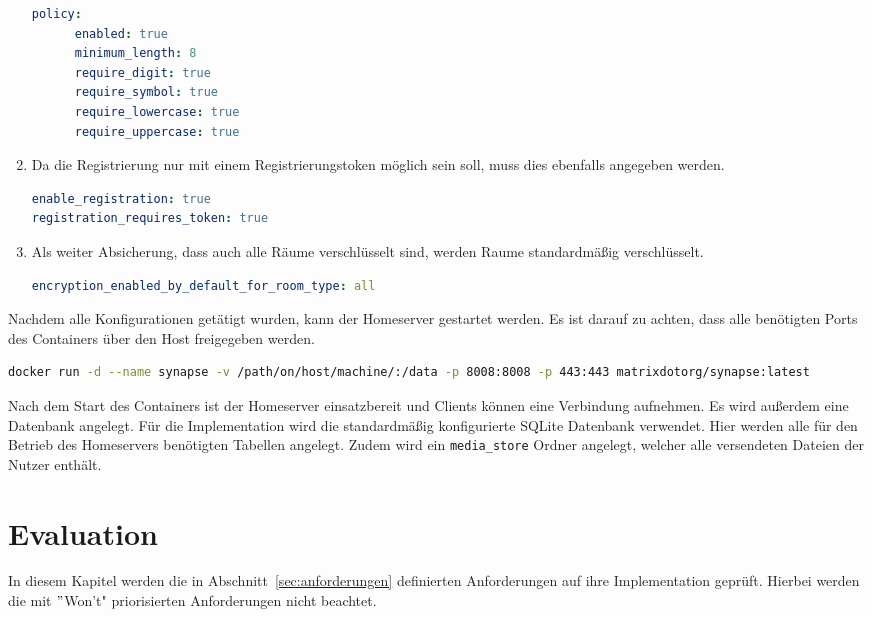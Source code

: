 \begin{enumerate}[label={(\arabic*)}]
\begin{lstlisting}[language=yaml,label={lst:password-policy}]
   policy:
      enabled: true
      minimum_length: 8
      require_digit: true
      require_symbol: true
      require_lowercase: true
      require_uppercase: true
            \end{lstlisting}
        \item Da die Registrierung nur mit einem Registrierungstoken möglich sein soll, muss dies ebenfalls angegeben werden.
        \begin{lstlisting}[language=yaml,label={lst:enable-registration}]
enable_registration: true
registration_requires_token: true
        \end{lstlisting}
        \item Als weiter Absicherung, dass auch alle Räume verschlüsselt sind, werden Raume standardmäßig verschlüsselt.
    \begin{lstlisting}[language=yaml,label={lst:enable-encryption}]
encryption_enabled_by_default_for_room_type: all
    \end{lstlisting}
    \end{enumerate}

    Nachdem alle Konfigurationen getätigt wurden, kann der Homeserver gestartet werden.
    Es ist darauf zu achten, dass alle benötigten Ports des Containers über den Host freigegeben werden.

    \begin{lstlisting}[language=bash,label={lst:synapse-start}]
docker run -d --name synapse -v /path/on/host/machine/:/data -p 8008:8008 -p 443:443 matrixdotorg/synapse:latest
    \end{lstlisting}

    Nach dem Start des Containers ist der Homeserver einsatzbereit und Clients können eine Verbindung aufnehmen.
    Es wird außerdem eine Datenbank angelegt.
    Für die Implementation wird die standardmäßig konfigurierte SQLite Datenbank verwendet.
    Hier werden alle für den Betrieb des Homeservers benötigten Tabellen angelegt.
    Zudem wird ein \texttt{media\_store} Ordner angelegt, welcher alle versendeten Dateien der Nutzer enthält.

    \newpage
    \chapter{Evaluation}\label{ch:evaluation}
    In diesem Kapitel werden die in Abschnitt~\ref{sec:anforderungen} definierten Anforderungen auf ihre Implementation geprüft.
    Hierbei werden die mit \("\)Won't" priorisierten Anforderungen nicht beachtet.

